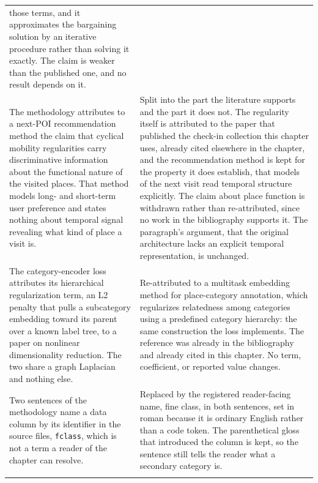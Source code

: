 \begin{table}[htb]
\begin{tabular}{@{}p{}p{}@{}}
those terms, and it approximates the bargaining solution by an iterative procedure rather than
solving it exactly. The claim is weaker than the published one, and no result depends on
it. \\
\addlinespace
The methodology attributes to a next-POI recommendation method the claim that cyclical
mobility regularities carry discriminative information about the functional nature of the
visited places. That method models long- and short-term user preference and states nothing
about temporal signal revealing what kind of place a visit is. &
Split into the part the literature supports and the part it does not. The regularity itself is
attributed to the paper that published the check-in collection this chapter uses, already
cited elsewhere in the chapter, and the recommendation method is kept for the property it does
establish, that models of the next visit read temporal structure explicitly. The claim about
place function is withdrawn rather than re-attributed, since no work in the bibliography
supports it. The paragraph's argument, that the original architecture lacks an explicit
temporal representation, is unchanged. \\
\addlinespace
The category-encoder loss attributes its hierarchical regularization term, an L2 penalty that
pulls a subcategory embedding toward its parent over a known label tree, to a paper on
nonlinear dimensionality reduction. The two share a graph Laplacian and nothing else. &
Re-attributed to a multitask embedding method for place-category annotation, which
regularizes relatedness among categories using a predefined category hierarchy: the same
construction the loss implements. The reference was already in the bibliography and already
cited in this chapter. No term, coefficient, or reported value changes. \\
\addlinespace
Two sentences of the methodology name a data column by its identifier in the source files,
\texttt{fclass}, which is not a term a reader of the chapter can resolve. &
Replaced by the registered reader-facing name, fine class, in both sentences, set in roman
because it is ordinary English rather than a code token. The parenthetical gloss that
introduced the column is kept, so the sentence still tells the reader what a secondary
category is. \\
\addlinespace

\end{tabular}
\end{table}
